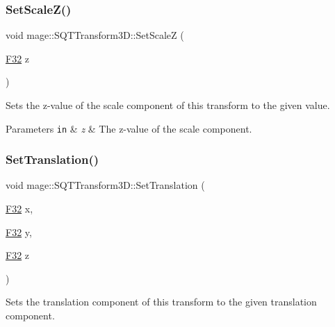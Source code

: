 \subsubsection{\texorpdfstring{Set\+Scale\+Z()}{SetScaleZ()}}
{\footnotesize\ttfamily void mage\+::\+S\+Q\+T\+Transform3\+D\+::\+Set\+ScaleZ (\begin{DoxyParamCaption}\item[{\mbox{\hyperlink{namespacemage_aa97e833b45f06d60a0a9c4fc22ae02c0}{F32}}}]{z }\end{DoxyParamCaption})\hspace{0.3cm}{\ttfamily [noexcept]}}

Sets the z-\/value of the scale component of this transform to the given value.


\begin{DoxyParams}[1]{Parameters}
\mbox{\tt in}  & {\em z} & The z-\/value of the scale component. \\
\hline
\end{DoxyParams}
\mbox{\label{classmage_1_1_s_q_t_transform3_d_ae0a9e979cf25222896126208b0cf0cda}} 
\subsubsection{\texorpdfstring{Set\+Translation()}{SetTranslation()}\hspace{0.1cm}{\footnotesize\ttfamily [1/3]}}
{\footnotesize\ttfamily void mage\+::\+S\+Q\+T\+Transform3\+D\+::\+Set\+Translation (\begin{DoxyParamCaption}\item[{\mbox{\hyperlink{namespacemage_aa97e833b45f06d60a0a9c4fc22ae02c0}{F32}}}]{x,  }\item[{\mbox{\hyperlink{namespacemage_aa97e833b45f06d60a0a9c4fc22ae02c0}{F32}}}]{y,  }\item[{\mbox{\hyperlink{namespacemage_aa97e833b45f06d60a0a9c4fc22ae02c0}{F32}}}]{z }\end{DoxyParamCaption})\hspace{0.3cm}{\ttfamily [noexcept]}}

Sets the translation component of this transform to the given translation component.



